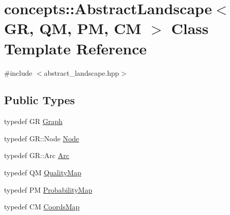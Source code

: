 \hypertarget{classconcepts_1_1_abstract_landscape}{}\section{concepts\+:\+:Abstract\+Landscape$<$ GR, QM, PM, CM $>$ Class Template Reference}
\label{classconcepts_1_1_abstract_landscape}


{\ttfamily \#include $<$abstract\+\_\+landscape.\+hpp$>$}

\subsection*{Public Types}
\begin{DoxyCompactItemize}
\item 
typedef GR \hyperlink{classconcepts_1_1_abstract_landscape_ab1988ca4ff36329c45af21e76046903d}{Graph}
\item 
typedef G\+R\+::\+Node \hyperlink{classconcepts_1_1_abstract_landscape_a7c2f90fb9f42302f1af84a59f4df4b91}{Node}
\item 
typedef G\+R\+::\+Arc \hyperlink{classconcepts_1_1_abstract_landscape_a0966623f028fe50ac9a3ae114dcf2672}{Arc}
\item 
typedef QM \hyperlink{classconcepts_1_1_abstract_landscape_aab540b896ac9b7a7a5783f2a78f304ad}{Quality\+Map}
\item 
typedef PM \hyperlink{classconcepts_1_1_abstract_landscape_ae90ffb759facff21b29e646539352182}{Probability\+Map}
\item 
typedef CM \hyperlink{classconcepts_1_1_abstract_landscape_a8432d7dff7edc5a5cbc524592b411f8a}{Coords\+Map}
\end{DoxyCompactItemize}
